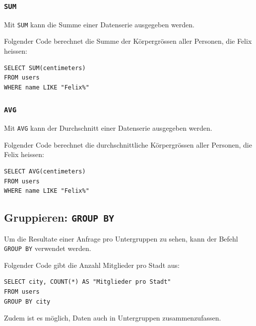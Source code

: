 \subsubsection{\lstinline[style=sql]|SUM|}

Mit \lstinline[style=sql]|SUM| kann die Summe einer Datenserie ausgegeben werden. 

\begin{myexample}
Folgender Code berechnet die Summe der Körpergrössen aller Personen, die Felix heissen:

\begin{lstlisting}[style=sql]
SELECT SUM(centimeters) 
FROM users 
WHERE name LIKE "Felix%"
\end{lstlisting}
\end{myexample}

\subsubsection{\lstinline[style=sql]|AVG|}

Mit \lstinline[style=sql]|AVG| kann der Durchschnitt einer Datenserie ausgegeben werden. 

\begin{myexample}
Folgender Code berechnet die durchschnittliche Körpergrössen aller Personen, die Felix heissen:

\begin{lstlisting}[style=sql]
SELECT AVG(centimeters) 
FROM users 
WHERE name LIKE "Felix%"
\end{lstlisting}
\end{myexample}

\subsection{Gruppieren: \lstinline[style=sql]|GROUP BY|}
Um die Resultate einer Anfrage pro Untergruppen zu sehen, kann der Befehl \lstinline[style=sql]|GROUP BY| verwendet werden.

\begin{myexample}
Folgender Code gibt die Anzahl Mitglieder pro Stadt aus:
\begin{lstlisting}[style=sql]
SELECT city, COUNT(*) AS "Mitglieder pro Stadt" 
FROM users 
GROUP BY city
\end{lstlisting}
\end{myexample}

Zudem ist es möglich, Daten auch in Untergruppen zusammenzufassen. 

